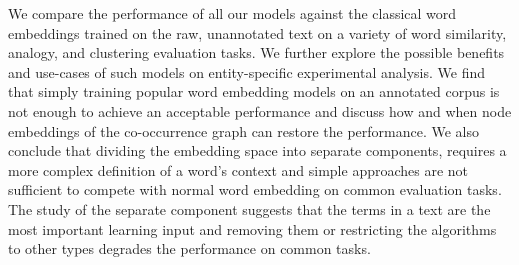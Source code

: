 We compare the performance of all our models against the classical word embeddings trained on the raw, unannotated text on a variety of word similarity, analogy, and clustering evaluation tasks. We further explore the possible benefits and use-cases of such models on entity-specific experimental analysis. We find that simply training popular word embedding models on an annotated corpus is not enough to achieve an acceptable performance and discuss how and when node embeddings of the co-occurrence graph can restore the performance. We also conclude that dividing the embedding space into separate components, requires a more complex definition of a word's context and simple approaches are not sufficient to compete with normal word embedding on common evaluation tasks. The study of the separate component suggests that the terms in a text are the most important learning input and removing them or restricting the algorithms to other types degrades the performance on common tasks.